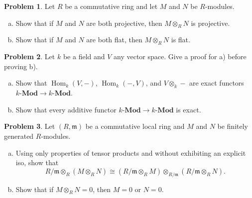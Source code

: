 \documentclass[11pt]{article}
\DeclareMathOperator{\Hom}{Hom}
\newcommand{\m}{\mathfrak{m}}
\theoremstyle{definition}
\newtheorem{problem}{Problem}
\begin{document}
\vfill

\begin{problem}
	Let $R$ be a commutative ring and let $M$ and $N$ be $R$-modules.
	
	\begin{enumerate}[a)]
		\item Show that if $M$ and $N$ are both projective, then $M \otimes_R N$ is projective.
		\item Show that if $M$ and $N$ are both flat, then $M \otimes_R N$ is flat.
	\end{enumerate}
\end{problem}



\vfill


\begin{problem}
	Let $k$ be a field and $V$ any vector space. Give a proof for a) before proving b).
	\begin{enumerate}[a)]
		\item Show that $\Hom_k(V,-)$, $\Hom_k(-,V)$, and $V \otimes_k -$ are exact functors $k\textbf{-Mod} \longrightarrow k\textbf{-Mod}$.
		\item Show that every additive functor $k\textbf{-Mod} \longrightarrow k\textbf{-Mod}$ is exact.
	\end{enumerate}
\end{problem}


\vfill

\begin{problem}
	Let $(R, \m)$ be a commutative local ring and $M$ and $N$ be finitely generated $R$-modules. 
	\begin{enumerate}[a)]
	\item Using only properties of tensor products and without exhibiting an explicit iso, show that
	$$R/\m \otimes_R (M \otimes_R N) \cong (R/\m \otimes_R M) \otimes_{R/\m} (R/\m \otimes_R N).$$
	\item Show that if $M \otimes_R N = 0$, then $M = 0$ or $N = 0$.
	\end{enumerate}
\end{problem}
\end{document}
